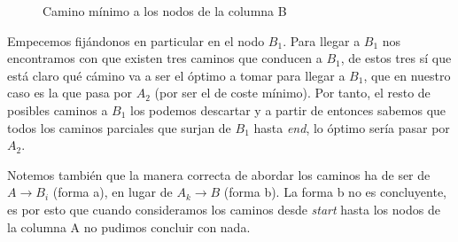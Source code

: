 \documentclass{article}
\begin{document}
\begin{figure}[!hbt]
    \centering
    \caption{Camino mínimo a los nodos de la columna B}
\end{figure}

Empecemos fijándonos en particular en el nodo $B_1$. Para llegar a 
$B_1$ nos encontramos con que existen tres caminos que conducen a $B_1$,
de estos tres sí que está claro qué cámino va a ser el óptimo a tomar para 
llegar a $B_1$, que en nuestro caso es la que pasa por $A_2$ (por ser el de coste mínimo). Por tanto,
el resto de posibles caminos a $B_1$ los podemos descartar y a partir de entonces 
sabemos que todos los caminos parciales que surjan de $B_1$ hasta \textit{end}, 
lo óptimo sería pasar por $A_2$.

Notemos también que la manera correcta de abordar los caminos 
ha de ser de $A\rightarrow B_i$ (forma a), en lugar de $A_k \rightarrow B$ (forma b).
La forma b no es concluyente, es por esto que cuando consideramos 
los caminos desde \textit{start} hasta los nodos de la columna A
no pudimos concluir con nada.
\end{document}
